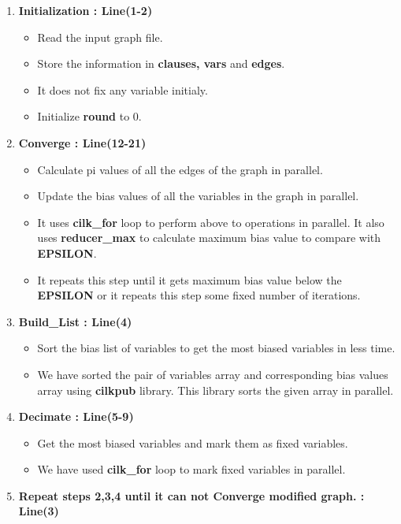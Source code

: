 \documentclass{article}
\begin{document}
\begin{enumerate}

\item \textbf{Initialization : Line(1-2)}
\begin{itemize}
\item Read the input graph file.
\item Store the information in \textbf{clauses, vars} and \textbf{edges}.
\item It does not fix any variable initialy.
\item Initialize \textbf{round} to 0. \\
\end{itemize}

\item \textbf{Converge : Line(12-21)}
\begin{itemize}
\item Calculate pi values of all the edges of the graph in parallel.
\item Update the bias values of all the variables in the graph in parallel.
\item It uses \textbf{cilk\_for} loop to perform above to operations in parallel. It also uses \textbf{reducer\_max} to calculate maximum bias value to compare with \textbf{EPSILON}.
\item It repeats this step until it gets maximum bias value below the \textbf{EPSILON} or it repeats this step some fixed number of iterations.
\end{itemize}

\item \textbf{Build\_List : Line(4)}
\begin{itemize}
\item Sort the bias list of variables to get the most biased variables in less time.
\item We have sorted the pair of variables array and corresponding bias values array using \textbf{cilkpub} library. This library sorts the given array in parallel.
\end{itemize}

\item \textbf{Decimate : Line(5-9)}
\begin{itemize}
\item Get the most biased variables and mark them as fixed variables.
\item We have used \textbf{cilk\_for} loop to mark fixed variables in parallel.
\end{itemize}

\item \textbf{Repeat steps 2,3,4 until it can not \textbf{Converge} modified graph. : Line(3)} \\

\end{enumerate} 
\end{document}
